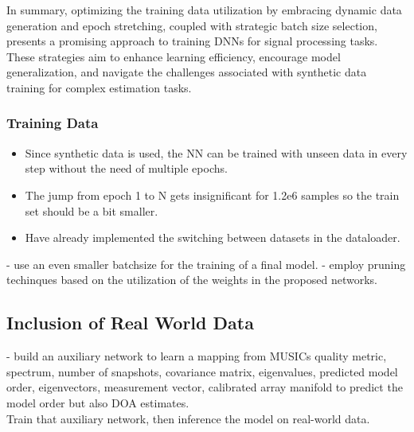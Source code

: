 In summary, optimizing the training data utilization by embracing dynamic data generation and epoch stretching, coupled with strategic batch size selection, presents a promising approach to training DNNs for signal processing tasks. These strategies aim to enhance learning efficiency, encourage model generalization, and navigate the challenges associated with synthetic data training for complex estimation tasks.
\subsubsection{Training Data}
\label{subsub:training_data}
\begin{itemize}
    \item Since synthetic data is used, the NN can be trained with unseen data in every step without the need of multiple epochs.
    \item The jump from epoch 1 to N gets insignificant for 1.2e6 samples so the train set should be a bit smaller.
    \item Have already implemented the switching between datasets in the dataloader.
\end{itemize}

- use an even smaller batchsize for the training of a final model.
- employ pruning techinques based on the utilization of the weights in the proposed networks.

\subsection{Inclusion of Real World Data}
- build an auxiliary network to learn a mapping from MUSICs quality metric, spectrum, number of snapshots, covariance matrix, eigenvalues,
predicted model order, eigenvectors, measurement vector, calibrated array manifold to predict the model order but also
DOA estimates.\\
Train that auxiliary network, then inference the model on real-world data.
